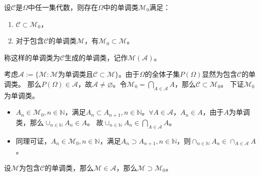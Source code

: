 \documentclass{ctexart}
\begin{document}
\begin{problem}\label{pro:1.4.6}
  设\(\mathcal{C} \)是\(\Omega \)中任一集代数，则存在\(\Omega \)中的单调类\(\mathcal{M}_0 \)满足：
  \begin{enumerate}
    \item \(\mathcal{C} \subset \mathcal{M}_0 \)，
    \item 对于包含\(\mathcal{C} \)的单调类\(\mathcal{M} \)，有\(\mathcal{M}_0 \subset \mathcal{M} \)。
  \end{enumerate}
  称这样的单调类为\(\mathcal{C} \)生成的单调类，记作\(\mathcal{M}(\mathcal{A}) \)。
\end{problem}
\begin{solution}
考虑\(\mathcal{A} :=\{\mathcal{M}:\mathcal{M} \text{为单调类且} \mathcal{C} \subset \mathcal{M} \} \)。由于\(\Omega \)的全体子集\(P(\Omega) \)显然为包含\(\mathcal{C} \)的单调类。
那么\(P(\Omega) \in \mathcal{A} \)，故\(\mathcal{A} \neq \varnothing\)。令\(\mathcal{M}_0=\bigcap_{A \in \mathcal{A}} A \)，那么\(\mathcal{C} \subset \mathcal{M}_0 \)。
下证\(\mathcal{M}_0 \)为单调类。
\begin{itemize}
  \item \(A_n \in \mathcal{M}_0, n \in \mathbb{N} \)，满足\(A_n \subset A_{n + 1}, n \in \mathbb{N} \)。\(\forall A \in \mathcal{A}  \)，\(A_n \in A \)，由于\(A \)为单调类，那么\(\cup_{n \in \mathbb{N}} A_n \in A \)。
    故\(\cup_{n \in \mathbb{N}} A_n \in \bigcap_{A \in \mathcal{A} }A \)。
  \item 同理可证，\(A_n \in \mathcal{M}_0, n \in \mathbb{N} \)，满足\(A_n \supset A_{n + 1}, n \in \mathbb{N} \)，则\(\cap_{n \in \mathbb{N}}A_n \in \cap_{A \in \mathcal{A} }A \)。
\end{itemize}
设\(\mathcal{M}  \)为包含\(\mathcal{C} \)的单调类，那么\(\mathcal{M} \in \mathcal{A} \)，那么\(\mathcal{M} \supset \mathcal{M}_0 \)。
\end{solution}
\end{document}
